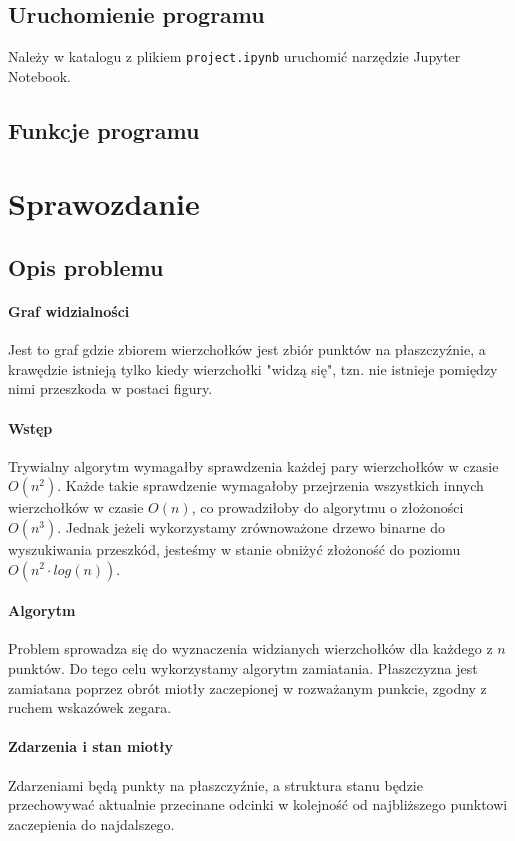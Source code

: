 \documentclass[12pt]{article}
\begin{document}
	\subsection{Uruchomienie programu}
		Należy w katalogu z plikiem \lstinline|project.ipynb| uruchomić narzędzie Jupyter Notebook.
	
	\subsection{Funkcje programu}
	
	\section{Sprawozdanie}
	
	\subsection{Opis problemu}
		\paragraph{Graf widzialności}
			Jest to graf gdzie zbiorem wierzchołków jest zbiór punktów na płaszczyźnie, a krawędzie istnieją tylko kiedy wierzchołki "widzą się", tzn. nie istnieje pomiędzy nimi przeszkoda w postaci figury.
		
		\paragraph{Wstęp}
			Trywialny algorytm wymagałby sprawdzenia każdej pary wierzchołków w czasie $ O(n^2) $. Każde takie sprawdzenie wymagałoby przejrzenia wszystkich innych wierzchołków w czasie $ O(n) $, co prowadziłoby do algorytmu o złożoności $ O(n^3) $. Jednak jeżeli wykorzystamy zrównoważone drzewo binarne do wyszukiwania przeszkód, jesteśmy w stanie obniżyć złożoność do poziomu $ O(n^2 \cdot log(n)) $.
		
		\paragraph{Algorytm}
			Problem sprowadza się do wyznaczenia widzianych wierzchołków dla każdego z $ n $ punktów. Do tego celu wykorzystamy algorytm zamiatania. Płaszczyzna jest zamiatana poprzez obrót miotły zaczepionej w rozważanym punkcie, zgodny z ruchem wskazówek zegara.
			
		\paragraph{Zdarzenia i stan miotły}
		Zdarzeniami będą punkty na płaszczyźnie, a struktura stanu będzie przechowywać aktualnie przecinane odcinki w kolejność od najbliższego punktowi zaczepienia do najdalszego.
	
\end{document}
